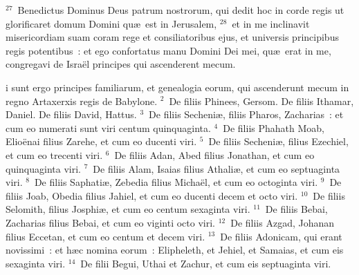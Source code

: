 ${}^{27}$~Benedictus Dominus Deus patrum nostrorum, qui dedit hoc in corde regis ut glorificaret domum Domini qu\ae\ est in Jerusalem,
${}^{28}$~et in me inclinavit misericordiam suam coram rege et consiliatoribus ejus, et universis principibus regis potentibus~: et ego confortatus manu Domini Dei mei, qu\ae\ erat in me, congregavi de Isra\"el principes qui ascenderent mecum.

\bchapter
{}i sunt ergo principes familiarum, et genealogia eorum, qui ascenderunt mecum in regno Artaxerxis regis de Babylone.
${}^{2}$~De filiis Phinees, Gersom. De filiis Ithamar, Daniel. De filiis David, Hattus.
${}^{3}$~De filiis Secheni\ae , filiis Pharos, Zacharias~: et cum eo numerati sunt viri centum quinquaginta.
${}^{4}$~De filiis Phahath Moab, Elio\"enai filius Zarehe, et cum eo ducenti viri.
${}^{5}$~De filiis Secheni\ae , filius Ezechiel, et cum eo trecenti viri.
${}^{6}$~De filiis Adan, Abed filius Jonathan, et cum eo quinquaginta viri.
${}^{7}$~De filiis Alam, Isaias filius Athali\ae , et cum eo septuaginta viri.
${}^{8}$~De filiis Saphati\ae , Zebedia filius Micha\"el, et cum eo octoginta viri.
${}^{9}$~De filiis Joab, Obedia filius Jahiel, et cum eo ducenti decem et octo viri.
${}^{10}$~De filiis Selomith, filius Josphi\ae , et cum eo centum sexaginta viri.
${}^{11}$~De filiis Bebai, Zacharias filius Bebai, et cum eo viginti octo viri.
${}^{12}$~De filiis Azgad, Johanan filius Eccetan, et cum eo centum et decem viri.
${}^{13}$~De filiis Adonicam, qui erant novissimi~: et h\ae c nomina eorum~: Elipheleth, et Jehiel, et Samaias, et cum eis sexaginta viri.
${}^{14}$~De filii Begui, Uthai et Zachur, et cum eis septuaginta viri.


